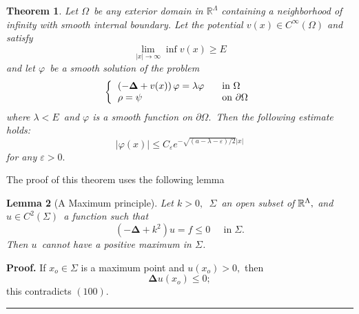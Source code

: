 \documentclass{article}
\newtheorem{theorem}{Theorem}
\newtheorem{lemma}[theorem]{Lemma}
\newenvironment{proof}[1][Proof]{\noindent\textbf{#1.} }{\ \rule{0.5em}{0.5em}}
\begin{document}
\begin{theorem}
\textit{Let }$\Omega $\textit{\ be any exterior domain in }$\mathbb{R}%
^{\Lambda }$ \textit{containing a neighborhood of infinity with smooth
internal boundary.} \textit{Let the potential }$v(x)\in C^{\infty }(\Omega )$
\textit{and} \textit{satisfy }%
\begin{equation}
\lim\limits_{\left| x\right| \rightarrow \infty }\inf v(x)\geq E
\end{equation}%
\textit{and let }$\varphi $\textit{\ be a smooth solution of the problem }%
\begin{equation}
\left\{ 
\begin{tabular}{ll}
$\left( -\mathbf{\Delta }+v(x)\right) \varphi =\lambda \varphi $ & \ \ in $%
\Omega $ \\ 
$\rho =\psi $ & \ \ on $\partial \Omega $%
\end{tabular}%
\right.
\end{equation}%
\textit{where }$\lambda <E$\textit{\ and }$\varphi $ is a smooth function on 
$\partial \Omega .$\textit{\ Then the following estimate holds: }%
\begin{equation}
\left| \varphi (x)\right| \leq C_{\varepsilon }e^{-\sqrt{\left( a-\lambda
-\varepsilon \right) /2}\left| x\right| }
\end{equation}%
\textit{for any }$\varepsilon >0.$
\end{theorem}

The proof of this theorem uses the following lemma

\begin{lemma}[A Maximum principle]
\textit{Let }$k>0,$\textit{\ }$\Sigma $\textit{\ an open subset of} $\mathbb{%
R}^{\Lambda },$ \textit{and }$u\in C^{2}(\Sigma )$\textit{\ a function such
that }%
\begin{equation}
\left( -\mathbf{\Delta }+k^{2}\right) u=f\leq 0\;\;\;\;\;\text{in}\;\Sigma .
\end{equation}%
\textit{Then }$u$\textit{\ cannot have a positive maximum in} $\Sigma $.
\end{lemma}

\begin{proof}
If $x_{o}\in \Sigma $ is a maximum point and $u(x_{o})>0,$ then 
\begin{equation}
\mathbf{\Delta }u(x_{o})\leq 0;
\end{equation}%
this contradicts $(100).$
\end{proof}
\end{document}

